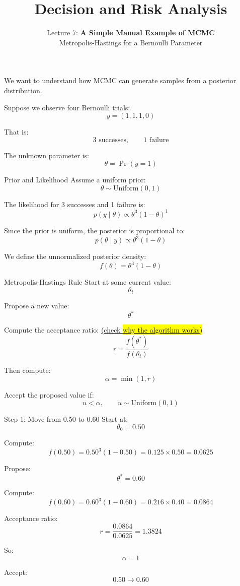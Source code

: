\documentclass[aspectratio=43,11pt]{beamer}
\title{Decision and Risk Analysis}
\subtitle{Lecture 7: \textbf{A Simple Manual Example of MCMC}\\
Metropolis-Hastings for a Bernoulli Parameter}
\author{}
\date{
\color{aggiemaroon}{
DAEN 427 / ISEN 427 / ISEN 627 - Fall 2026\\
\textbf{Alexander Abuabara}
}
}
\begin{document}
\begin{frame}[plain]
  \titlepage
\end{frame}

\begin{frame}{}
We want to understand how MCMC can generate samples from a posterior distribution.

\vspace{0.4cm}
Suppose we observe four Bernoulli trials:
\[
 y = (1,1,1,0)
\]

That is:
\[
 3 \text{ successes}, \qquad 1 \text{ failure}
\]

\vspace{0.3cm}
The unknown parameter is:
\[
\theta = \Pr(y=1)
\]
\end{frame}

\begin{frame}{Prior and Likelihood}
Assume a uniform prior:
\[
\theta \sim \text{Uniform}(0,1)
\]

The likelihood for 3 successes and 1 failure is:
\[
 p(y \mid \theta) \propto \theta^3(1-\theta)^1
\]

Since the prior is uniform, the posterior is proportional to:
\[
 p(\theta \mid y) \propto \theta^3(1-\theta)
\]

We define the unnormalized posterior density:
\[
 f(\theta)=\theta^3(1-\theta)
\]
\end{frame}

\begin{frame}{Metropolis-Hastings Rule}
Start at some current value:
\[
\theta_t
\]

Propose a new value:
\[
\theta^*
\]

Compute the acceptance ratio:
\href{https://www.bayesrulesbook.com/chapter-7\#why-the-algorithm-works}{\footnotesize (check \hl{why the algorithm works)}}
\[
 r = \frac{f(\theta^*)}{f(\theta_t)}
\]

Then compute:
\[
 \alpha = \min(1,r)
\]

Accept the proposed value if:
\[
 u < \alpha, \qquad u \sim \text{Uniform}(0,1)
\]
\end{frame}

\begin{frame}{Step 1: Move from 0.50 to 0.60}
Start at:
\[
\theta_0 = 0.50
\]

Compute:
\[
 f(0.50)=0.50^3(1-0.50)=0.125 \times 0.50=0.0625
\]

Propose:
\[
\theta^*=0.60
\]

Compute:
\[
 f(0.60)=0.60^3(1-0.60)=0.216 \times 0.40=0.0864
\]

Acceptance ratio:
\[
 r=\frac{0.0864}{0.0625}=1.3824
\]

So:
\[
\alpha=1
\]

Accept:
\[
0.50 \rightarrow 0.60
\]
\end{frame}
\end{document}
